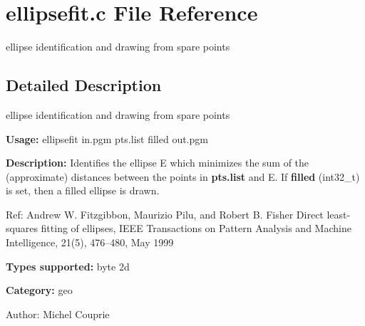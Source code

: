 \section{ellipsefit.c File Reference}
\label{ellipsefit_8c}
ellipse identification and drawing from spare points 



\subsection{Detailed Description}
ellipse identification and drawing from spare points 

{\bf Usage:} ellipsefit in.pgm pts.list filled out.pgm

{\bf Description:} Identifies the ellipse E which minimizes the sum of the (approximate) distances between the points in {\bf pts.list} and E. If {\bf filled} (int32\_\-t) is set, then a filled ellipse is drawn.

Ref: Andrew W. Fitzgibbon, Maurizio Pilu, and Robert B. Fisher Direct least-squares fitting of ellipses, IEEE Transactions on Pattern Analysis and Machine Intelligence, 21(5), 476--480, May 1999

{\bf Types supported:} byte 2d

{\bf Category:} geo

\begin{Desc}
\item[Author:]Michel Couprie \end{Desc}
